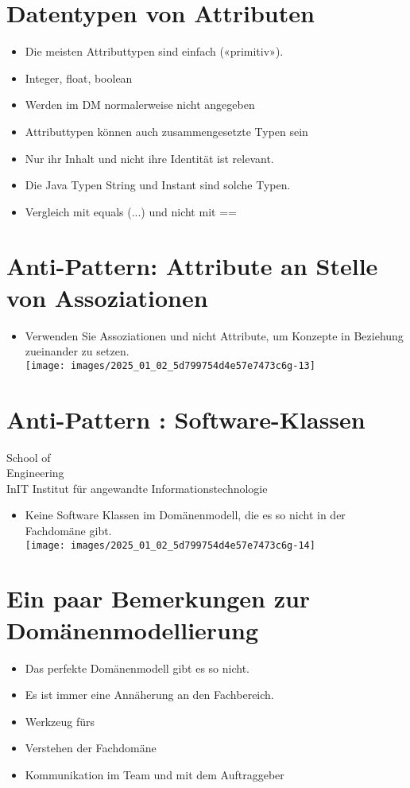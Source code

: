 \documentclass[10pt]{article}
\begin{document}
\section*{Datentypen von Attributen}
\begin{itemize}
  \item Die meisten Attributtypen sind einfach («primitiv»).
  \item Integer, float, boolean
  \item Werden im DM normalerweise nicht angegeben
  \item Attributtypen können auch zusammengesetzte Typen sein
  \item Nur ihr Inhalt und nicht ihre Identität ist relevant.
  \item Die Java Typen String und Instant sind solche Typen.
  \item Vergleich mit equals (...) und nicht mit ==
\end{itemize}

\section*{Anti-Pattern: Attribute an Stelle von Assoziationen}
\begin{itemize}
  \item Verwenden Sie Assoziationen und nicht Attribute, um Konzepte in Beziehung zueinander zu setzen.\\
\texttt{[image: images/2025\_01\_02\_5d799754d4e57e7473c6g-13]}
\end{itemize}

\section*{Anti-Pattern : Software-Klassen}
School of\\
Engineering\\
InIT Institut für angewandte Informationstechnologie

\begin{itemize}
  \item Keine Software Klassen im Domänenmodell, die es so nicht in der Fachdomäne gibt.\\
\texttt{[image: images/2025\_01\_02\_5d799754d4e57e7473c6g-14]}
\end{itemize}

\section*{Ein paar Bemerkungen zur Domänenmodellierung}
\begin{itemize}
  \item Das perfekte Domänenmodell gibt es so nicht.
  \item Es ist immer eine Annäherung an den Fachbereich.
  \item Werkzeug fürs
  \item Verstehen der Fachdomäne
  \item Kommunikation im Team und mit dem Auftraggeber
\end{itemize}
\end{document}
